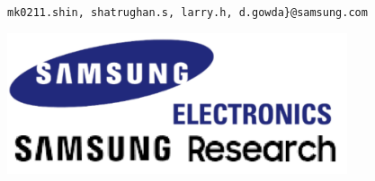 \documentclass[a0,portrait]{a0poster}
\begin{document}
\begin{minipage}[t]{1.0\linewidth}
\begin{center}
\begin{minipage}[t]{0.79\textwidth}
\begin{center}
  \large \tt  {mk0211.shin, shatrughan.s, larry.h, d.gowda\}@samsung.com }
    \end{center}
  \end{minipage}
  \begin{minipage}[t]{0.1\textwidth}
    \begin{center}
    \includegraphics[width=10cm]{samsung_research} %
    \end{center}
  \end{minipage} \hfill
\end{center}
\end{minipage}
%
%
%
\vspace{-2mm} %
%
%
\end{document}
